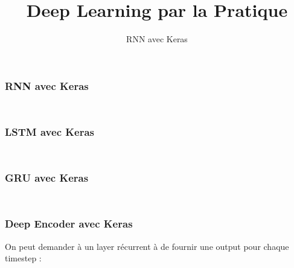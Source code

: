 \documentclass{formation}
\title{Deep Learning par la Pratique}
\subtitle{RNN avec Keras}
\begin{document}
\maketitle

\begin{frame}
  \frametitle{RNN avec Keras}
  \inputminted[linenos,fontsize=\small,bgcolor=pythonbg]{python}{code-illustration/tf-keras-rnn.py}
  \inputminted[linenos,fontsize=\small,bgcolor=returnbg]{python}{code-illustration/tf-keras-rnn.txt}
\end{frame}

\begin{frame}
  \frametitle{LSTM avec Keras}
  \inputminted[linenos,fontsize=\small,bgcolor=pythonbg]{python}{code-illustration/tf-keras-lstm.py}
  \inputminted[linenos,fontsize=\small,bgcolor=returnbg]{python}{code-illustration/tf-keras-lstm.txt}
\end{frame}

\begin{frame}
  \frametitle{GRU avec Keras}
  \inputminted[linenos,fontsize=\small,bgcolor=pythonbg]{python}{code-illustration/tf-keras-gru.py}
  \inputminted[linenos,fontsize=\small,bgcolor=returnbg]{python}{code-illustration/tf-keras-gru.txt}
\end{frame}

\begin{frame}
  \frametitle{Deep Encoder avec Keras}
  On peut demander à un layer récurrent à de fournir une output pour chaque timestep :
  \inputminted[linenos,fontsize=\small,bgcolor=pythonbg]{python}{code-illustration/tf-keras-rnn-all-timestep.py}
  \inputminted[linenos,fontsize=\small,bgcolor=returnbg]{python}{code-illustration/tf-keras-gru.txt}
\end{frame}
\end{document}

